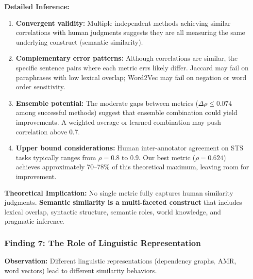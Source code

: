 \documentclass[11pt,a4paper]{article}
\begin{document}
\textbf{Detailed Inference:}
\begin{enumerate}
    \item \textbf{Convergent validity:} Multiple independent methods achieving similar correlations with human judgments suggests they are all measuring the same underlying construct (semantic similarity).
    
    \item \textbf{Complementary error patterns:} Although correlations are similar, the specific sentence pairs where each metric errs likely differ. Jaccard may fail on paraphrases with low lexical overlap; Word2Vec may fail on negation or word order sensitivity.
    
    \item \textbf{Ensemble potential:} The moderate gaps between metrics ($\Delta\rho \leq 0.074$ among successful methods) suggest that ensemble combination could yield improvements. A weighted average or learned combination may push correlation above 0.7.
    
    \item \textbf{Upper bound considerations:} Human inter-annotator agreement on STS tasks typically ranges from $\rho = 0.8$ to $0.9$. Our best metric ($\rho = 0.624$) achieves approximately 70--78\% of this theoretical maximum, leaving room for improvement.
\end{enumerate}

\textbf{Theoretical Implication:} No single metric fully captures human similarity judgments. \textbf{Semantic similarity is a multi-faceted construct} that includes lexical overlap, syntactic structure, semantic roles, world knowledge, and pragmatic inference.

\subsubsection{Finding 7: The Role of Linguistic Representation}

\textbf{Observation:} Different linguistic representations (dependency graphs, AMR, word vectors) lead to different similarity behaviors.
\end{document}
